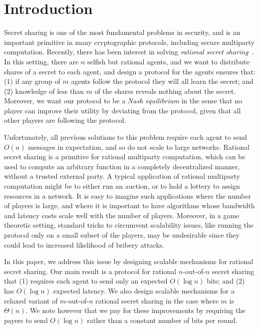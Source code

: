 \documentclass[12pt]{article}
\theoremstyle{definition}
\begin{document}
\section{Introduction}
Secret sharing is one of the most fundamental problems in security,
and is an important primitive in many cryptographic protocols,
including secure multiparty computation.  Recently, there has been
interest in solving \emph{rational secret
  sharing}~\cite{kol2008games, gordon2006rational, halpern2004rational, 
abraham2006distributed,lysyanskaya2006rationality}.
In this setting, there are $n$ selfish but rational agents, and we
want to distribute shares of a secret to each agent, and design a
protocol for the agents ensures that: (1) if any group of $m$ agents
follow the protocol they will all learn the secret; and (2) knowledge
of less than $m$ of the shares reveals nothing about the secret.
Moreover, we want our protocol to be a \emph{Nash equilibrium} in the
sense that no player can improve their utility by deviating from the
protocol, given that all other players are following the protocol.

Unfortunately, all previous solutions to this problem require each
agent to send $O(n)$ messages in expectation, and so do not scale to
large networks.  Rational secret sharing is a primitive for rational
multiparty computation, which can be used to compute an arbitrary
function in a completely decentralized manner, without a trusted
external party.  A typical application of rational multiparty
computation might be to either run an auction, or to hold a lottery to
assign resources in a network.  It is easy to imagine such
applications where the number of players is large, and where it is
important to have algorithms whose bandwidth and latency costs scale
well with the number of players.  Moreover, in a game theoretic
setting, standard tricks to circumvent scalability issues, like
running the protocol only on a small subset of the players, may be
undesirable since they could lead to increased likelihood of bribery
attacks.

In this paper, we address this issue by designing scalable mechanisms
for rational secret sharing.  Our main result is a protocol for
rational $n$-out-of-$n$ secret sharing that (1) requires each agent to
send only an expected $O(\log n)$ bits; and (2) has $O(\log n)$ expected
latency.  We also design scalable mechanisms for a relaxed variant of
$m$-out-of-$n$ rational secret sharing in the case where $m$ is
$\Theta(n)$. We note however that we pay for these improvements by requiring 
the payers to send $O(\log n)$ rather than a constant number of bits per round.
\end{document}
